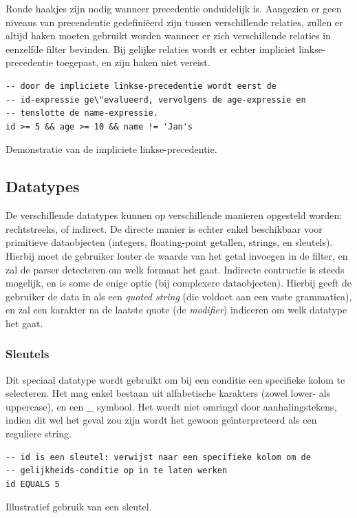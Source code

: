 Ronde haakjes zijn nodig wanneer precedentie onduidelijk is. Aangezien er geen niveaus van precendentie gedefini\"eerd zijn tussen verschillende relaties, zullen er altijd haken moeten gebruikt worden wanneer er zich verschillende relaties in eenzelfde filter bevinden. Bij gelijke relaties wordt er echter impliciet linkse-precedentie toegepast, en zijn haken niet vereist.

\begin{code}
\begin{verbatim}
-- door de impliciete linkse-precedentie wordt eerst de
-- id-expressie ge\"evalueerd, vervolgens de age-expressie en
-- tenslotte de name-expressie.
id >= 5 && age >= 10 && name != 'Jan's

\end{verbatim}
\caption{Demonstratie van de impliciete linkse-precedentie.}
\end{code}

\subsection{Datatypes}

De verschillende datatypes kunnen op verschillende manieren opgesteld worden: rechtstreeks, of indirect. De directe manier is echter enkel beschikbaar voor primitieve dataobjecten (integers, floating-point getallen, strings, en sleutels). Hierbij moet de gebruiker louter de waarde van het getal invoegen in de filter, en zal de parser detecteren om welk formaat het gaat.
Indirecte contructie is steeds mogelijk, en is some de enige optie (bij complexere dataobjecten). Hierbij geeft de gebruiker de data in als een \emph{quoted string} (die voldoet aan een vaste grammatica), en zal een karakter na de laatste quote (de \emph{modifier}) indiceren om welk datatype het gaat.

\subsubsection{Sleutels}

Dit speciaal datatype wordt gebruikt om bij een conditie een specifieke kolom te selecteren. Het mag enkel bestaan uit alfabetische karakters (zowel lower- als uppercase), en een \_ symbool. Het wordt niet omringd door aanhalingstekens, indien dit wel het geval zou zijn wordt het gewoon ge\"interpreteerd als een reguliere string.

\begin{code}
\begin{verbatim}
-- id is een sleutel: verwijst naar een specifieke kolom om de
-- gelijkheids-conditie op in te laten werken
id EQUALS 5
\end{verbatim}
\caption{Illustratief gebruik van een sleutel.}
\end{code}

